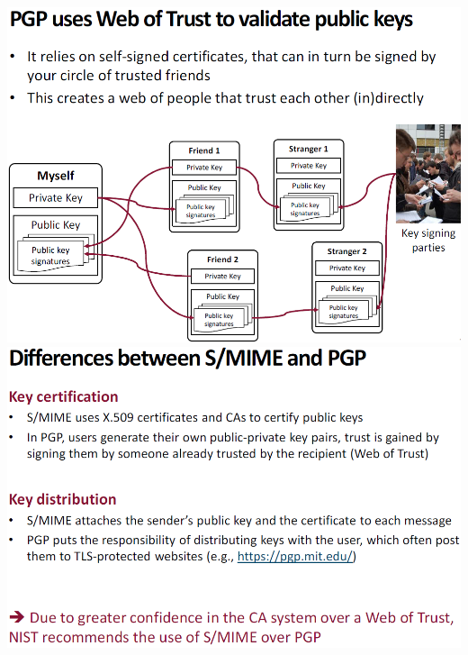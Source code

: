\documentclass[12pt]{article}
\begin{document}
 \includegraphics[width=0.9\linewidth]{./slides/L8P1PGPK.PNG}\\
 \includegraphics[width=\linewidth]{./slides/L8P1COMP.PNG}
 
\end{document}
